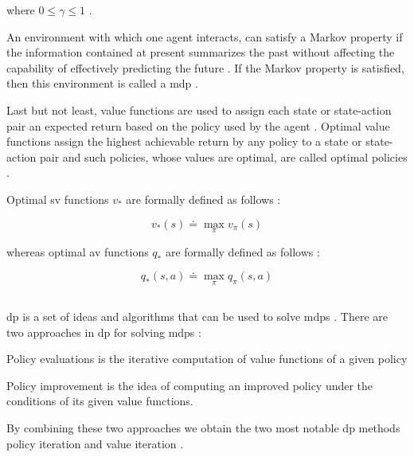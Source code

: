 where $0 \leq \gamma \leq 1$ \citep[p. 73]{Sutton2017}.

An environment  with which one agent interacts, can satisfy a Markov property if the information contained at present summarizes the past without affecting the capability of effectively predicting the future \citep[p. 73]{Sutton2017}. If the Markov property is satisfied, then this environment is called a \gls{mdp} \citep[p. 73]{Sutton2017}.

Last but not least, value functions are used to assign each state or state-action pair an expected return based on the policy used by the agent \citep[p. 74]{Sutton2017}. Optimal value functions assign the highest achievable return by any policy to a state or state-action pair  and such policies, whose values are optimal, are called optimal policies \citep[p. 74]{Sutton2017}.

Optimal \gls{sv} functions $v_*$ are formally defined as follows \citep[p. 74]{Sutton2017}:

\begin{equation}
	v_* (s) \doteq \max_\pi v_\pi (s)
\end{equation}

whereas optimal \gls{av} functions $q_*$ are formally defined as follows \citep[p. 74]{Sutton2017}:

\begin{equation}
	q_* (s,a) \doteq \max_\pi q_\pi (s,a)
\end{equation}

\subsection{}
\label{subsec:dp}

\gls{dp} is a set of ideas and algorithms that can be used to solve \glspl{mdp} \citep[p. 95]{Sutton2017}. There are two approaches in \gls{dp} for solving \glspl{mdp} \citep[p. 95]{Sutton2017}:
\begin{enumerate*}
	\item Policy evaluations is the iterative computation of value functions of a given policy
	\item Policy improvement is the idea of computing an improved policy under the conditions of its given value functions.
\end{enumerate*}

By combining these two approaches we obtain the two most notable \gls{dp} methods \ie policy iteration and value iteration \citep[p. 95]{Sutton2017}.

